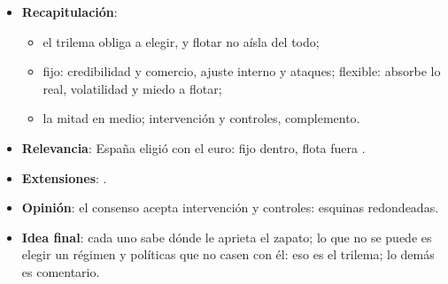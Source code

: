 \documentclass{article}
\begin{document}
\begin{columnas}
\begin{itemize}
\item \textbf{Recapitulación}:
  \begin{itemize}
  \item el trilema obliga a elegir, y flotar no aísla del todo;
  \item fijo: credibilidad y comercio, ajuste interno y ataques; flexible: absorbe lo real, volatilidad y miedo a flotar;
  \item la mitad en medio; intervención y controles, complemento.
  \end{itemize}
\item \textbf{Relevancia}: España eligió con el euro: fijo dentro, flota fuera  .
\item \textbf{Extensiones}:      .
\item \textbf{Opinión}: el consenso acepta intervención y controles: esquinas redondeadas.
\item \textbf{Idea final}: cada uno sabe dónde le aprieta el zapato; lo que no se puede es elegir un régimen y políticas que no casen con él: eso es el trilema; lo demás es comentario.
\end{itemize}


\end{columnas}
\end{document}
